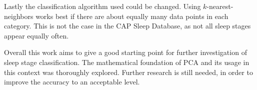 Lastly the classification algorithm used could be changed. Using $k$-nearest-neighbors works best if there are about equally many data points in each category. This is not the case in the CAP Sleep Database, as not all sleep stages appear equally often.

Overall this work aims to give a good starting point for further investigation of sleep stage classification. The mathematical foundation of PCA and its usage in this context was thoroughly explored. Further research is still needed, in order to improve the accuracy to an acceptable level.